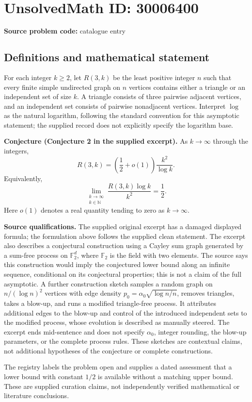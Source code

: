 \documentclass[11pt]{article}
\newcommand{\N}{\mathbb{N}}
\newcommand{\F}{\mathbb{F}}
\begin{document}
\section*{UnsolvedMath ID: 30006400}
\textbf{Source problem code:} catalogue entry
\subsection{Definitions and mathematical statement}
For each integer \(k\geq 2\), let \(R(3,k)\) be the least positive integer \(n\) such that every finite simple undirected graph on \(n\) vertices contains either a triangle or an independent set of size \(k\). A triangle consists of three pairwise adjacent vertices, and an independent set consists of pairwise nonadjacent vertices. Interpret \(\log\) as the natural logarithm, following the standard convention for this asymptotic statement; the supplied record does not explicitly specify the logarithm base.

\textbf{Conjecture (Conjecture 2 in the supplied excerpt).} As \(k\to\infty\) through the integers,
\[
R(3,k)=\left(\frac12+o(1)\right)\frac{k^2}{\log k}.
\]
Equivalently,
\[
\lim_{\substack{k\to\infty\\k\in\N}}\frac{R(3,k)\log k}{k^2}=\frac12.
\]
Here \(o(1)\) denotes a real quantity tending to zero as \(k\to\infty\).

\textbf{Source qualifications.} The supplied original excerpt has a damaged displayed formula; the formulation above follows the supplied clean statement. The excerpt also describes a conjectural construction using a Cayley sum graph generated by a sum-free process on \(\F_2^d\), where \(\F_2\) is the field with two elements. The source says this construction would imply the conjectured lower bound along an infinite sequence, conditional on its conjectural properties; this is not a claim of the full asymptotic. A further construction sketch samples a random graph on \(n/(\log n)^2\) vertices with edge density \(p_0=\alpha_0\sqrt{\log n/n}\), removes triangles, takes a blow-up, and runs a modified triangle-free process. It attributes additional edges to the blow-up and control of the introduced independent sets to the modified process, whose evolution is described as manually steered. The excerpt ends mid-sentence and does not specify \(\alpha_0\), integer rounding, the blow-up parameters, or the complete process rules. These sketches are contextual claims, not additional hypotheses of the conjecture or complete constructions.

The registry labels the problem open and supplies a dated assessment that a lower bound with constant \(1/2\) is available without a matching upper bound. These are supplied curation claims, not independently verified mathematical or literature conclusions.
\end{document}
